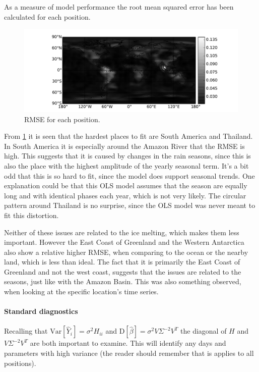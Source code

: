As a measure of  model performance the root mean squared error has been calculated for each position.
\begin{figure}[H]
	\centering
	\includegraphics[width=\textwidth]{figures/ols-world-performance-rmse}
	\caption{RMSE for each position.}
	\label{fig:ols-world-performance-rmse}
\end{figure}

From \ref{fig:ols-world-performance-rmse} it is seen that the hardest places to fit are South America and Thailand. In South America it is especially around the Amazon River that the RMSE is high. This suggests that it is caused by changes in the rain seasons, since this is also the place with the highest amplitude of the yearly seasonal term. It's a bit odd that this is so hard to fit, since the model does support seasonal trends. One explanation could be that this OLS model assumes that the season are equally long and with identical phases each year, which is not very likely. The circular pattern around Thailand is no surprise, since the OLS model was never meant to fit this distortion.

Neither of these issues are related to the ice melting, which makes them less important. However the East Coast of Greenland and the Western Antarctica also show a relative higher RMSE, when comparing to the ocean or the nearby land, which is less than ideal. The fact that it is primarily the East Coast of Greenland and not the west coast, suggests that the issues are related to the seasons, just like with the Amazon Basin. This was also something observed, when looking at the specific location's time series.

\paragraph{Standard diagnostics} Recalling that $\mathrm{Var}[\hat{Y}_i] = \sigma^{2} H_{ii}$ and $\mathrm{D}[\hat{\beta}] = \sigma^{2} V \Sigma^{-2} V^T$ the diagonal of $H$ and $V \Sigma^{-2} V^T$ are both important to examine. This will identify any days and parameters with high variance (the reader should remember that is applies to all positions).

